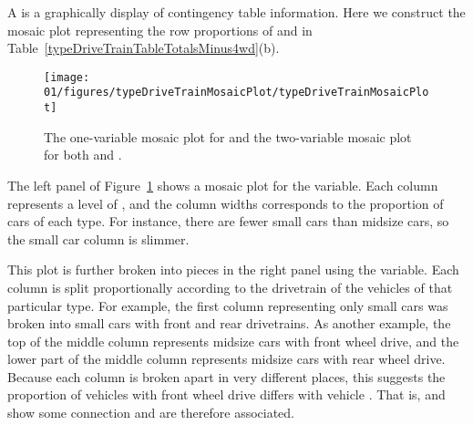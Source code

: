 
A  is a graphically display of contingency table information. Here we construct the mosaic plot representing the row proportions of  and  in Table~\ref{typeDriveTrainTableTotalsMinus4wd}(b).
\begin{figure}
   \centering
   \texttt{[image: 01/figures/typeDriveTrainMosaicPlot/typeDriveTrainMosaicPlot]}
   \caption{The one-variable mosaic plot for  and the two-variable mosaic plot for both  and .}
   \label{typeDriveTrainMosaicPlot}
\end{figure}

The left panel of Figure~\ref{typeDriveTrainMosaicPlot} shows a mosaic plot for the  variable. Each column represents a level of , and the column widths corresponds to the proportion of cars of each type. For instance, there are fewer small cars than midsize cars, so the small car column is slimmer.

This plot is further broken into pieces in the right panel using the  variable. Each column is split proportionally according to the drivetrain of the vehicles of that particular type. For example, the first column representing only small cars was broken into small cars with front and rear drivetrains. %
As another example, the top of the middle column represents {midsize} cars with front wheel drive, and the lower part of the middle column represents {midsize} cars with rear wheel drive. Because each column is broken apart in very different places, this suggests the proportion of vehicles with front wheel drive differs with vehicle . That is,  and  show some connection and are therefore associated.


